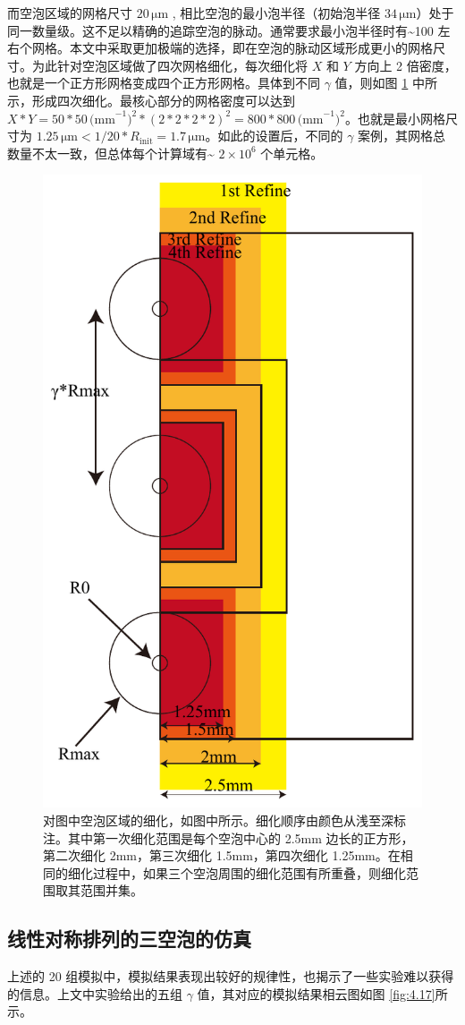 而空泡区域的网格尺寸 $20\,\mathrm{\mu m}$ ,
相比空泡的最小泡半径（初始泡半径
$34\,\mathrm{\mu m}$）处于同一数量级。这不足以精确的追踪空泡的脉动。通常要求最小泡半径时有\textasciitilde100
左右个网格。本文中采取更加极端的选择，即在空泡的脉动区域形成更小的网格尺寸。为此针对空泡区域做了四次网格细化，每次细化将
$X$ 和 $Y$ 方向上 2
倍密度，也就是一个正方形网格变成四个正方形网格。具体到不同 $\gamma$
值，则如图 \ref{fig:4.16} 中所示，形成四次细化。最核心部分的网格密度可以达到
$X*Y=50*50\,\mathrm{(mm}^{-1})^2*(2*2*2*2)^2=800*800\,\mathrm{(mm}^{-1})^2$。也就是最小网格尺寸为
$1.25\,\mathrm{\mu m}<1/20*R_\mathrm{init}=1.7\,\mathrm{\mu m}$。如此的设置后，不同的
$\gamma$
案例，其网格总数量不太一致，但总体每个计算域有\textasciitilde{}
$2\times 10^6$ 个单元格。

\begin{figure}[H]
    \centering
    \includegraphics[width=0.6\linewidth]{img/fig4.16.pdf}
    \caption[]{对图中空泡区域的细化，如图中所示。细化顺序由颜色从浅至深标注。其中第一次细化范围是每个空泡中心的
2.5mm 边长的正方形，第二次细化 2mm，第三次细化 1.5mm，第四次细化
1.25mm。在相同的细化过程中，如果三个空泡周围的细化范围有所重叠，则细化范围取其范围并集。}
    \label{fig:4.16}
\end{figure}


\subsection{线性对称排列的三空泡的仿真}
上述的 20
组模拟中，模拟结果表现出较好的规律性，也揭示了一些实验难以获得的信息。上文中实验给出的五组
$\gamma$ 值，其对应的模拟结果相云图如图 \ref{fig:4.17}所示。

